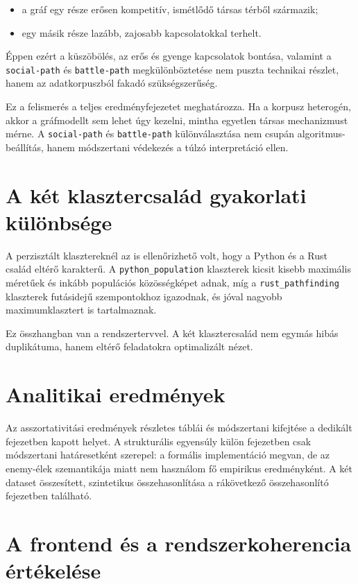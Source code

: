\begin{itemize}
    \item a gráf egy része erősen kompetitív, ismétlődő társas térből származik;
    \item egy másik része lazább, zajosabb kapcsolatokkal terhelt.
\end{itemize}

Éppen ezért a küszöbölés, az erős és gyenge kapcsolatok bontása, valamint a \texttt{social-path} és \texttt{battle-path} megkülönböztetése nem puszta technikai részlet, hanem az adatkorpuszból fakadó szükségszerűség.

Ez a felismerés a teljes eredményfejezetet meghatározza. Ha a korpusz heterogén, akkor a gráfmodellt sem lehet úgy kezelni, mintha egyetlen társas mechanizmust mérne. A \texttt{social-path} és \texttt{battle-path} különválasztása nem csupán algoritmus-beállítás, hanem módszertani védekezés a túlzó interpretáció ellen.

\section{A két klasztercsalád gyakorlati különbsége}

A perzisztált klasztereknél az is ellenőrizhető volt, hogy a Python és a Rust család eltérő karakterű. A \texttt{python\_population} klaszterek kicsit kisebb maximális méretűek és inkább populációs közösségképet adnak, míg a \texttt{rust\_pathfinding} klaszterek futásidejű szempontokhoz igazodnak, és jóval nagyobb maximumklasztert is tartalmaznak.

Ez összhangban van a rendszertervvel. A két klasztercsalád nem egymás hibás duplikátuma, hanem eltérő feladatokra optimalizált nézet.

\section{Analitikai eredmények}

Az asszortativitási eredmények részletes táblái és módszertani kifejtése a dedikált fejezetben kapott helyet. A strukturális egyensúly külön fejezetben csak módszertani határesetként szerepel: a formális implementáció megvan, de az enemy-élek szemantikája miatt nem használom fő empirikus eredményként. A két dataset összesített, szintetikus összehasonlítása a rákövetkező összehasonlító fejezetben található.

\section{A frontend és a rendszerkoherencia értékelése}

